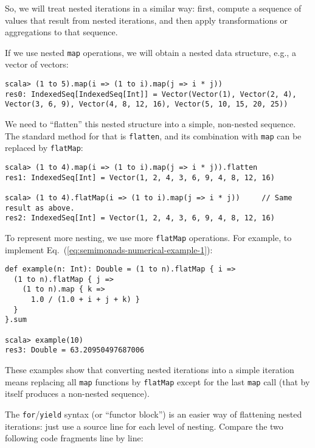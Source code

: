 So, we will treat nested iterations in a similar way: first, compute
a sequence of values that result from nested iterations, and then
apply transformations or aggregations to that sequence.

If we use nested \lstinline!map! operations, we will obtain a nested
data structure, e.g., a vector of vectors:
\begin{lstlisting}
scala> (1 to 5).map(i => (1 to i).map(j => i * j))
res0: IndexedSeq[IndexedSeq[Int]] = Vector(Vector(1), Vector(2, 4), Vector(3, 6, 9), Vector(4, 8, 12, 16), Vector(5, 10, 15, 20, 25))
\end{lstlisting}
We need to \textsf{``}flatten\textsf{''} this nested structure into a simple, non-nested
sequence. The standard method for that is \lstinline!flatten!, and
its combination with \lstinline!map! can be replaced by \lstinline!flatMap!:
\begin{lstlisting}
scala> (1 to 4).map(i => (1 to i).map(j => i * j)).flatten
res1: IndexedSeq[Int] = Vector(1, 2, 4, 3, 6, 9, 4, 8, 12, 16)

scala> (1 to 4).flatMap(i => (1 to i).map(j => i * j))     // Same result as above.
res2: IndexedSeq[Int] = Vector(1, 2, 4, 3, 6, 9, 4, 8, 12, 16)
\end{lstlisting}
To represent more nesting, we use more \lstinline!flatMap! operations.
For example, to implement Eq.~(\ref{eq:semimonads-numerical-example-1}):
\begin{lstlisting}
def example(n: Int): Double = (1 to n).flatMap { i =>
  (1 to n).flatMap { j =>
    (1 to n).map { k => 
      1.0 / (1.0 + i + j + k) }
  }
}.sum

scala> example(10)
res3: Double = 63.20950497687006
\end{lstlisting}
These examples show that converting nested iterations into a simple
iteration means replacing all \lstinline!map! functions by \lstinline!flatMap!
except for the last \lstinline!map! call (that by itself produces
a non-nested sequence).

The \lstinline!for!/\lstinline!yield! syntax (or \textsf{``}functor block\textsf{''})
is an easier way of flattening nested iterations: just use a source
line for each level of nesting. Compare the two following code fragments
line by line:

